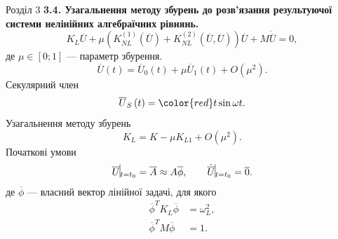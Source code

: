 \documentclass[8pt]{beamer}
\numberwithin{figure}{section}
\numberwithin{equation}{section}
\numberwithin{table}{section}
\begin{document}
\begin{frame}{Розділ 3}
\textbf{3.4. Узагальнення методу збурень до розв’язання результуючої системи нелінійних алгебраїчних рівнянь.}
\begin{equation}\label{eq:nonlineq}
K_L\overline{U}+\mu \left( K_{NL}^{(1)}\left( \overline{U}\right)+K_{NL}^{(2)}\left( \overline{U},\overline{U}\right) \right)\overline{U}+M\ddot{\overline{U}}=0,
\end{equation}
де $\mu \in [0;1]$ --- параметр збурення.
\begin{equation}
\overline{U}\left(t\right) =\overline{U}_0\left(t\right) + \mu \overline{U}_1\left(t\right) + O\left( \mu^2\right).
\end{equation}
Секулярний член
\begin{equation}
\overline{U}_S\left(t\right) =\begingroup\color{red}t\endgroup \sin \omega t.
\end{equation}
Узагальнення методу збурень
\begin{equation}
K_L = K - \mu K_{L1} + O\left( \mu^2\right).
\end{equation}
Початкові умови
\begin{align}
\overline{U}\vline _{t=t_0}=\overline{A}\approx A\overline{\phi},\qquad \dot{\overline{U}}\vline _{t=t_0}=\overline{0}.
\end{align}
де $\overline{\phi}$ --- власний вектор лінійної задачі, для якого
\begin{equation}\label{eq:lin_prop}
\begin{aligned}
\overline{\phi}^T K_L \overline{\phi} &= \omega_L^2 , \\
\overline{\phi}^T M \overline{\phi} &= 1 .
\end{aligned}
\end{equation}
\end{frame}
\end{document}
